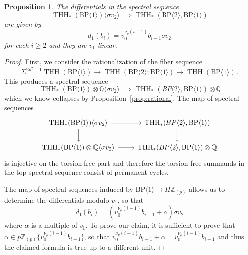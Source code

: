 \documentclass[11pt]{amsart}
\newcommand{\mr}[1]{\mathrm{#1}}
\newcommand{\Z}{\mathbb{Z}}
\newcommand{\BP}{\mr{BP}}
\DeclareMathOperator{\THH}{THH}
\newtheorem{proposition}[equation]{Proposition}
\theoremstyle{definition}
\numberwithin{equation}{section}
\numberwithin{figure}{section}
\begin{document}
\begin{proposition}\label{theorem:differentialellcoeff}
The differentials in the spectral sequence
\[ 
\THH_*(\BP\langle 1\rangle)\langle \sigma v_2\rangle \implies \THH_*(\BP\langle 2\rangle,\BP\langle 1\rangle)
\]
are given by 
\[
  d_1(b_i)\dot{=} v_0^{\nu_p(i-1)}b_{i-1} \sigma v_2
\]
for each $i \geq 2$ and they are $v_1$-linear.
\end{proposition}

\begin{proof}
  First, we consider the rationalization of the fiber sequence 
  \[ 
    \Sigma^{2p^2-1}\THH(\BP\langle 1\rangle)\to \THH(\BP\langle 2\rangle ;\BP\langle 1\rangle)\to \THH(\BP\langle 1\rangle) \,.
  \]
  This produces a spectral sequence 
  \[ 
    \THH_*(\BP\langle 1\rangle)\otimes \mathbb{Q}\langle \sigma v_2\rangle \implies \THH_*(BP\langle 2\rangle,\BP\langle 1\rangle)\otimes \mathbb{Q}
  \]
  which we know collapses by Proposition~\ref{prop:rational}. The map of spectral sequences 
  \[ 
    \begin{tikzcd}
      \THH_*(\BP\langle 1\rangle)\langle \sigma v_2\rangle \ar[d] \arrow[=>]{r} & \THH_*(BP\langle 2\rangle,\BP\langle 1\rangle)\ar[d] \\
      \THH_*(\BP\langle 1\rangle)\otimes \mathbb{Q}\langle \sigma v_2\rangle \arrow[=>]{r} & \THH_*(BP\langle 2\rangle,\BP\langle 1\rangle)\otimes \mathbb{Q}
    \end{tikzcd}
  \]
  is injective on the torsion free part and therefore the torsion free summands in the top spectral sequence consist of permanent cycles.

  The map of spectral sequences induced by $\BP\langle 1\rangle\to H\mathbb{Z}_{(p)}$
allows us to determine the differentials modulo $v_1$, so that
  \[
    d_1(b_i) \dot{=} (v_0^{\nu_p(i-1)}b_{i-1} + \alpha ) \sigma v_2
  \]
  where $\alpha$ is a multiple of $v_1$. To prove our claim, it is sufficient to prove that $\alpha \in p \Z_{(p)}\{ v_0^{\nu_p(i-1)}b_{i-1} \}$, so that $v_0^{\nu_p(i-1)}b_{i-1} + \alpha \dot{=} v_0^{\nu_p(i-1)}b_{i-1}$ and thus the claimed formula  is true up to a different unit.


\end{proof}
\end{document}
